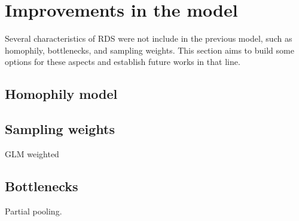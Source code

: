 \section{Improvements in the model}

Several characteristics of RDS were not include in the previous model, such as
homophily, bottlenecks, and sampling weights. This section aims to build some
options for these aspects and establish future works in that line. 

\subsection{Homophily model}

\cite{yauck2021general} 

\subsection{Sampling weights}

GLM weighted

\subsection{Bottlenecks}

Partial pooling. 